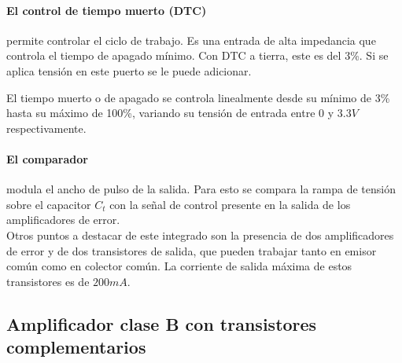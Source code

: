 \paragraph{El control de tiempo muerto (DTC)} permite controlar el ciclo de trabajo. 
Es una entrada de alta impedancia que controla el tiempo de apagado mínimo. Con DTC a tierra, este es del 3\%.
Si se aplica tensión en este puerto se le puede adicionar.

El tiempo muerto o de apagado se controla linealmente desde su mínimo de 3\% hasta su máximo de 100\%, 
variando su tensión de entrada entre $0$ y $3.3V$ respectivamente. 

\paragraph{El comparador} modula el ancho de pulso de la salida.
Para esto se compara la rampa de tensión sobre el capacitor $C_t$ con la señal de control
presente en la salida de los amplificadores de error.\\

Otros puntos a destacar de este integrado son la presencia de dos amplificadores de error y de dos transistores de salida,
que pueden trabajar tanto en emisor común como en colector común. La corriente de salida máxima de estos transistores es de $200mA.$





\subsection{Amplificador clase B con transistores complementarios}

